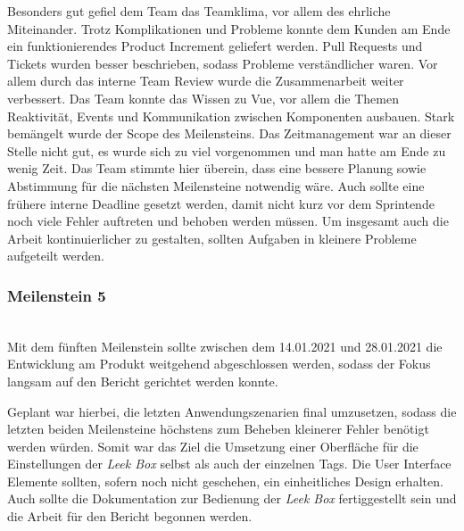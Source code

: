 \documentclass[10pt, a4paper]{article}
\begin{document}
Besonders gut gefiel dem Team das Teamklima, vor allem des ehrliche Miteinander.
Trotz Komplikationen und Probleme konnte dem Kunden am Ende ein funktionierendes Product Increment geliefert werden.
Pull Requests und Tickets wurden besser beschrieben, sodass Probleme verständlicher waren.
Vor allem durch das interne Team Review wurde die Zusammenarbeit weiter verbessert.
Das Team konnte das Wissen zu Vue, vor allem die Themen Reaktivität, Events und Kommunikation zwischen Komponenten ausbauen.
Stark bemängelt wurde der Scope des Meilensteins.
Das Zeitmanagement war an dieser Stelle nicht gut, es wurde sich zu viel vorgenommen und man hatte am Ende zu wenig Zeit.
Das Team stimmte hier überein, dass eine bessere Planung sowie Abstimmung für die nächsten Meilensteine notwendig wäre.
Auch sollte eine frühere interne Deadline gesetzt werden, damit nicht kurz vor dem Sprintende noch viele Fehler auftreten und behoben werden müssen.
Um insgesamt auch die Arbeit kontinuierlicher zu gestalten, sollten Aufgaben in kleinere Probleme aufgeteilt werden.

\subsubsection*{Meilenstein 5} $~$ \\
Mit dem fünften Meilenstein sollte zwischen dem 14.01.2021 und 28.01.2021 die Entwicklung am Produkt weitgehend abgeschlossen werden, sodass der Fokus langsam auf den Bericht gerichtet werden konnte.

Geplant war hierbei, die letzten Anwendungszenarien final umzusetzen, sodass die letzten beiden Meilensteine höchstens zum Beheben kleinerer Fehler benötigt werden würden.
Somit war das Ziel die Umsetzung einer Oberfläche für die Einstellungen der \textit{Leek Box} selbst als auch der einzelnen Tags.
Die User Interface Elemente sollten, sofern noch nicht geschehen, ein einheitliches Design erhalten.
Auch sollte die Dokumentation zur Bedienung der \textit{Leek Box} fertiggestellt sein und die Arbeit für den Bericht begonnen werden.
\end{document}
